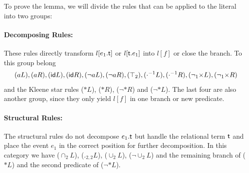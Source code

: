 \documentclass[a4paper,twoside,12pt, english]{article}
\begin{document}
\noindent To prove the lemma, we will divide the rules that can be applied to the literal into two groups:

\paragraph{Decomposing Rules: } These rules directly transform $l[e_1.\textsf{\upshape t}]$ or $l[\textsf{\upshape t}.e_1]$ into $l[f]$ or close the branch. 
To this group belong \[(aL), (aR), (\textsf{\upshape id} L), (\textsf{\upshape id} R), (\neg aL), (\neg aR), (\top_2), (\cdot^{{-1}} L), (\cdot^{{-1}} R), (\neg_1 {\times}L), (\neg_1 {\times}R)\] and the Kleene star rules ($*L$), ($*R$), ($\neg *R$) and ($\neg *L$). The last four are also another group, since they only yield $l[f]$ in one branch or new predicate. 

\paragraph{Structural Rules: } The structural rules do not decompose $e_1.\textsf{\upshape t}$ but handle the relational term $\textsf{\upshape t}$ and place the event $e_1$ in the correct position for further decomposition.
In this category we have ($\cap_2L$), ($._{2,2}L$), ($\cup_2L$), ($\neg \cup_2 L$) and the remaining branch of ($*L$) and the second predicate of ($\neg *L$). 
\end{document}
